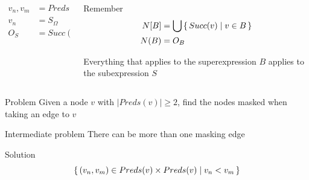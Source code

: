 \documentclass[xcolor = {dvipsnames, table}]{beamer}
\begin{document}
\begin{frame}
    \begin{columns}
        \begin{column}{0.5\textwidth}
            \begin{align*}
                { v_n, v_m } &= Preds(v) \\
                v_n &= S_\Omega \\
                O_S &=  Succ(v_n) \\
            \end{align*}
        \end{column}

        \begin{column}{0.5\textwidth}
            \begin{block}{Remember}
                \begin{align*}
                    N[B] &= \bigcup \set{Succ(v) \mid v \in B} \\
                    N(B) &= O_B \\
                \end{align*}
            \end{block}

            Everything that applies to the superexpression $B$ applies to the
            subexpression $S$
        \end{column}
    \end{columns}
\end{frame}

\begin{frame}
    \begin{block}{Problem}
        Given a node $v$ with $|Preds(v)| \geq 2$, find the nodes masked when
        taking an edge to $v$
    \end{block}

    \begin{block}{Intermediate problem}
        There can be more than one masking edge
    \end{block}

    \begin{block}{Solution}
        \begin{equation*}
            \set{(v_n, v_m) \in Preds(v) \times Preds(v) \mid v_n < v_m}
        \end{equation*}
    \end{block}
\end{frame}
\end{document}
